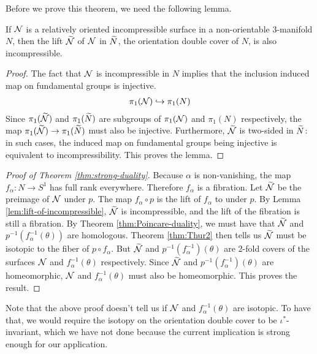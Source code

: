 Before we prove this theorem, we need the following lemma.
\begin{lem}
  \label{lem:lift-of-incompressible}
  If $\mathcal{N}$ is a relatively oriented incompressible surface in a non-orientable $3$-manifold $N$, then the lift $\widetilde{\mathcal{N}}$ of $\mathcal{N}$ in $\widetilde{N}$, the orientation double cover of $N$, is also incompressible.
\end{lem}
\begin{proof}
  The fact that $\mathcal{N}$ is incompressible in $N$ implies that the inclusion induced map on fundamental groups is injective.
  \begin{align*}
    \pi_1(\mathcal{N}) \hookrightarrow \pi_1(N)
  \end{align*}
  Since $\pi_1(\widetilde{\mathcal{N}})$ and $\pi_1(\widetilde{N})$ are subgroups of $\pi_1(\mathcal{N})$ and $\pi_1(N)$ respectively, the map $\pi_1(\widetilde{\mathcal{N}}) \to \pi_1(\widetilde{N})$ must also be injective.
  Furthermore, $\widetilde{\mathcal{N}}$ is two-sided in $\widetilde{N}$: in such cases, the induced map on fundamental groups being injective is equivalent to incompressibility.
  This proves the lemma.
\end{proof}

\begin{proof}[Proof of Theorem \ref{thm:strong-duality}]
  Because $\alpha$ is non-vanishing, the map $f_{\alpha}: N \to S^1$ has full rank everywhere.  Therefore $f_\alpha$ is a fibration.
  Let $\widetilde{\mathcal{N}}$ be the preimage of $\mathcal{N}$ under $p$.  The map $f_{\alpha} \circ p$ is the lift of $f_{\alpha}$ to under $p$.
  By Lemma \ref{lem:lift-of-incompressible}, $\widetilde{\mathcal{N}}$ is incompressible, and the lift of the fibration is still a fibration.
  By Theorem \ref{thm:Poincare-duality}, we must have that $\widetilde{\mathcal{N}}$ and $p^{-1}(f_{\alpha}^{-1}(\theta))$ are homologous.
  Theorem \ref{thm:Thur2} then tells us $\widetilde{\mathcal{N}}$ must be isotopic to the fiber of $p \circ f_{\alpha}$.
  But $\widetilde{\mathcal{N}}$ and $p^{-1}(f_{\alpha}^{-1})(\theta)$ are 2-fold covers of the surfaces $\mathcal{N}$ and $f_{\alpha}^{-1}(\theta)$ respectively.
  Since $\widetilde{\mathcal{N}}$ and $p^{-1}(f_{\alpha}^{-1})(\theta)$ are homeomorphic, $\mathcal{N}$ and $f_{\alpha}^{-1}(\theta)$ must also be homeomorphic.
  This proves the result.
\end{proof}

\begin{rem}
  Note that the above proof doesn't tell us if $\mathcal{N}$ and $f_{\alpha}^{-1}(\theta)$ are isotopic.
  To have that, we would require the isotopy on the orientation double cover to be $\iota^{\ast}$-invariant, which we have not done because the current implication is strong enough for our application.
\end{rem}


